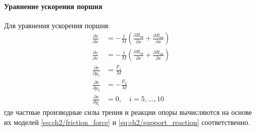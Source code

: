 \paragraph{Уравнение ускорения поршня}
Для уравнения ускорения поршня:
\begin{equation}\label{eq:ch2/jacobian_acceleration}
    \begin{aligned}
        \frac{\partial \dot{v}}{\partial x}   & = -\frac{1}{M}\left(\frac{\partial R_\text{тр}}{\partial x} + \frac{\partial R_\text{оп}}{\partial x}\right) \\
        \frac{\partial \dot{v}}{\partial v}   & = -\frac{1}{M}\left(\frac{\partial R_\text{тр}}{\partial v} + \frac{\partial R_\text{оп}}{\partial v}\right) \\
        \frac{\partial \dot{v}}{\partial p_1} & = \frac{F_1}{M}                                                                                              \\
        \frac{\partial \dot{v}}{\partial p_2} & = -\frac{F_2}{M}                                                                                             \\
        \frac{\partial \dot{v}}{\partial y_i} & = 0, \quad i = 5, \ldots, 10
    \end{aligned}
\end{equation}
где частные производные силы трения и реакции опоры вычисляются на основе их моделей
\eqref{eq:ch2/friction_force} и \eqref{eq:ch2/support_reaction} соответственно.

